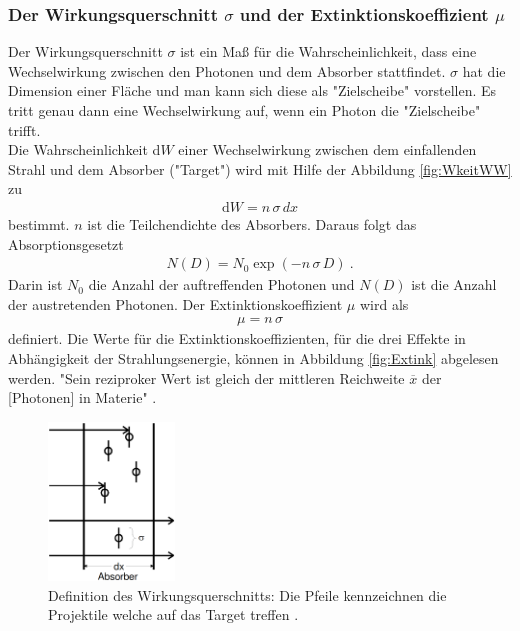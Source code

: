 \subsubsection{Der Wirkungsquerschnitt \texorpdfstring{$\sigma$}{} und der Extinktionskoeffizient \texorpdfstring{$\mu$}{}}
Der Wirkungsquerschnitt $\sigma$ ist ein Maß für die Wahrscheinlichkeit, dass eine Wechselwirkung zwischen den Photonen und dem Absorber stattfindet. $\sigma$ hat die Dimension einer Fläche und man kann sich diese als "Zielscheibe" vorstellen. Es tritt genau dann eine Wechselwirkung auf, wenn ein Photon die "Zielscheibe" trifft. \\
Die Wahrscheinlichkeit d$W$ einer Wechselwirkung zwischen dem einfallenden Strahl und dem Absorber ("Target") wird mit Hilfe der Abbildung \eqref{fig:WkeitWW} zu
\begin{align}
	\text{d}W = n\,\sigma\,dx
\end{align}
bestimmt. $n$ ist die Teilchendichte des Absorbers.
Daraus folgt das Absorptionsgesetzt
\begin{align}
	N(D) = N_0 \exp(-n\,\sigma\,D) \ .
	\label{eqn:absorption}
\end{align}
Darin ist $N_0$ die Anzahl der auftreffenden Photonen und $N(D)$ ist die Anzahl der austretenden Photonen. Der Extinktionskoeffizient $\mu$ wird als
\begin{align}
	\mu = n\,\sigma
\end{align}
definiert. Die Werte für die Extinktionskoeffizienten, für die drei Effekte in Abhängigkeit der Strahlungsenergie, können in Abbildung \eqref{fig:Extink} abgelesen werden. "Sein reziproker Wert ist gleich der mittleren Reichweite $\overline{x}$ der [Photonen] in Materie" \cite[2]{V18}.

\begin{figure}
	\centering
	\includegraphics[width=0.3\textwidth]{Bilder/WkeitWW.png}
	\caption{Definition des Wirkungsquerschnitts: Die Pfeile kennzeichnen die Projektile welche auf das Target treffen \cite{V18}.}
	\label{fig:WkeitWW}
\end{figure}

